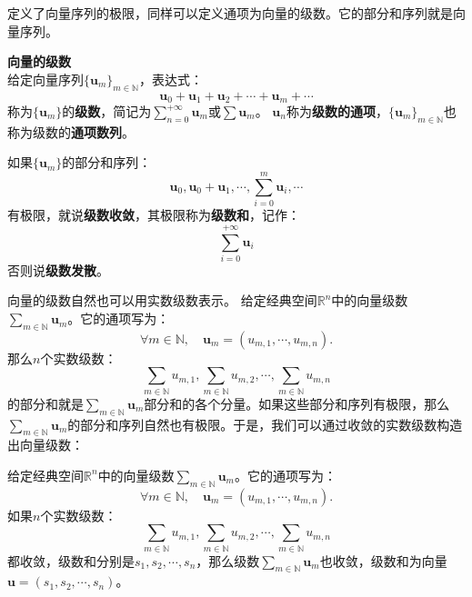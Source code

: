\documentclass[12pt,UTF8]{ctexbook}
\begin{document}
定义了向量序列的极限，同样可以定义通项为向量的级数。它的部分和序列就是向量序列。
\begin{df}{\textbf{向量的级数}}
    \mbox{} \\
    给定向量序列$\{\mathbf{u}_m\}_{m\in\mathbb{N}}$，表达式：
    $$ \mathbf{u}_0 + \mathbf{u}_1 + \mathbf{u}_2 + \cdots + \mathbf{u}_m + \cdots $$
    称为$\{\mathbf{u}_m\}$的\textbf{级数}，简记为$\sum_{n=0}^{+\infty} \mathbf{u}_m$或$\sum \mathbf{u}_m$。
    $\mathbf{u}_n$称为\textbf{级数的通项}，$\{\mathbf{u}_m\}_{m\in\mathbb{N}}$也称为级数的\textbf{通项数列}。
    
    如果$\{\mathbf{u}_m\}$的部分和序列：
    $$ \mathbf{u}_0, \mathbf{u}_0 + \mathbf{u}_1, \cdots , \sum_{i=0}^m \mathbf{u}_i, \cdots $$
    有极限，就说\textbf{级数收敛}，其极限称为\textbf{级数和}，记作：
    $$ \sum_{i=0}^{+\infty} \mathbf{u}_i $$
    否则说\textbf{级数发散}。
    
\end{df}

向量的级数自然也可以用实数级数表示。
给定经典空间$\mathbb{R}^n$中的向量级数$\sum_{m\in\mathbb{N}} \mathbf{u}_m$。它的通项写为：
$$ \forall m\in\mathbb{N}, \quad \mathbf{u}_m = (u_{m,1}, \cdots, u_{m,n}).$$
那么$n$个实数级数：
$$ \sum_{m\in\mathbb{N}} u_{m,1}, \sum_{m\in\mathbb{N}} u_{m,2}, \cdots , \sum_{m\in\mathbb{N}} u_{m,n} $$
的部分和就是$\sum_{m\in\mathbb{N}} \mathbf{u}_m$部分和的各个分量。如果这些部分和序列有极限，那么$\sum_{m\in\mathbb{N}} \mathbf{u}_m$的部分和序列自然也有极限。于是，我们可以通过收敛的实数级数构造出向量级数：
\begin{tm}
    给定经典空间$\mathbb{R}^n$中的向量级数$\sum_{m\in\mathbb{N}} \mathbf{u}_m$。它的通项写为：
    $$ \forall m\in\mathbb{N}, \quad \mathbf{u}_m = (u_{m,1}, \cdots, u_{m,n}).$$
    如果$n$个实数级数：
    $$ \sum_{m\in\mathbb{N}} u_{m,1}, \sum_{m\in\mathbb{N}} u_{m,2}, \cdots , \sum_{m\in\mathbb{N}} u_{m,n} $$
    都收敛，级数和分别是$s_1, s_2, \cdots, s_n$，那么级数$\sum_{m\in\mathbb{N}} \mathbf{u}_m$也收敛，级数和为向量$\mathbf{u} = (s_1, s_2, \cdots, s_n)$。
\end{tm}
\end{document}
